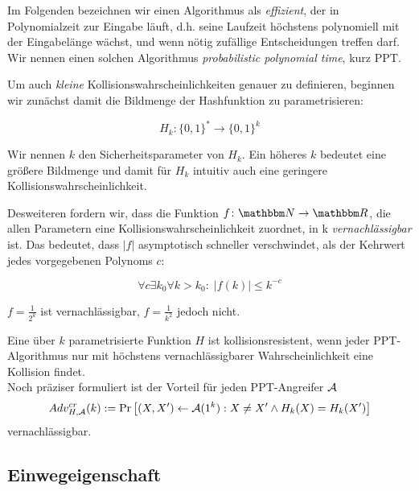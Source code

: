 Im Folgenden bezeichnen wir einen Algorithmus als \emph{effizient}, der in Polynomialzeit zur Eingabe läuft, d.h. seine Laufzeit höchstens
polynomiell mit der Eingabelänge wächst, und wenn nötig zufällige Entscheidungen treffen darf. Wir nennen einen solchen Algorithmus \textit{probabilistic
polynomial time}, kurz PPT.

Um auch \emph{kleine} Kollisionswahrscheinlichkeiten genauer zu definieren, beginnen wir zunächst damit die Bildmenge der Hashfunktion zu parametrisieren:

\begin{equation*}
H_k \colon \{0,1\}^* \rightarrow \{0,1\}^k
\end{equation*}

Wir nennen $k$ den Sicherheitsparameter von $H_k$. Ein höheres $k$ bedeutet eine größere Bildmenge und damit für $H_k$ intuitiv auch eine geringere
Kollisionswahrscheinlichkeit.

Desweiteren fordern wir, dass die Funktion $f \colon \N \rightarrow \R$, die allen Parametern eine Kollisionswahrscheinlichkeit zuordnet, in k
\emph{vernachlässigbar} ist. Das bedeutet, dass $|f|$ asymptotisch schneller verschwindet, als der Kehrwert jedes vorgegebenen Polynoms $c$:

\begin{equation*}
\forall c \exists k_0 \forall k > k_0: \; \left| f(k) \right| \leq k^{-c}
\end{equation*}

\begin{beispiel}
$f = \frac{1}{2^k}$ ist vernachlässigbar, $f = \frac{1}{k^2}$ jedoch nicht.
\end{beispiel}
\vspace{10pt}

\begin{definition}[Kollisionsresistenz]
Eine über $k$ parametrisierte Funktion $H$ ist kollisionsresistent, wenn jeder PPT-Algorithmus nur mit höchstens vernachlässigbarer Wahrscheinlichkeit eine Kollision findet.~\\
Noch präziser formuliert ist der Vorteil für jeden PPT-Angreifer $\mathcal{A}$
\begin{equation*}
Adv^{cr}_{H,\mathcal{A}}(k):= \Pr \left[ (X, X') \leftarrow \mathcal{A}(1^k) : X \neq X' \land H_k(X) = H_k(X')\right]
\end{equation*}
vernachlässigbar.
\end{definition}

\subsection{Einwegeigenschaft}

